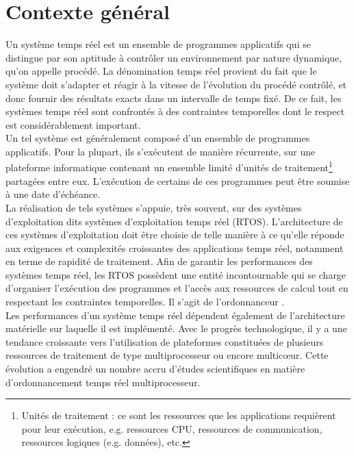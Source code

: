 \section{{Contexte général}}


Un  système  temps  réel  est  un  ensemble  de  programmes  applicatifs  qui  se  distingue  par  son aptitude à contrôler un environnement par nature dynamique, qu’on appelle procédé. La dénomination temps réel provient du fait que le système doit s’adapter et réagir à la vitesse de l’évolution du procédé contrôlé, et donc fournir des résultats exacts dans un intervalle de temps fixé. De ce fait, les systèmes temps  réel  sont  confrontés  à  des  contraintes temporelles  dont  le  respect  est  considérablement important.\\


Un tel système est généralement composé d'un ensemble de programmes applicatifs. Pour la plupart, ils s'exécutent de manière récurrente,
sur une plateforme informatique contenant un ensemble limité d’unités de traitement\footnote{Unités  de  traitement :  ce sont  les 
	ressources  que  les  applications  requièrent  pour  leur  exécution,  e.g.  ressources CPU, ressources de 
	communication, ressources logiques (e.g. données), etc.} partagées entre eux. L'exécution de certains de ces programmes peut être soumise à une date d'échéance. \\


La réalisation de tels systèmes s'appuie, très souvent, sur des systèmes d’exploitation dits systèmes d’exploitation temps réel (RTOS). L’architecture de ces systèmes d’exploitation doit être choisie de telle manière à ce qu’elle réponde aux exigences et complexités croissantes des applications temps  réel,  notamment en  terme de rapidité  de 
traitement.  Afin  de  garantir  les  performances  des  systèmes temps réel, les RTOS possèdent une entité incontournable qui se 
charge d’organiser l’exécution des programmes et l’accès aux ressources de calcul tout en respectant les contraintes temporelles. Il s’agit de l’ordonnanceur \cite{FLOMAN}.\\

Les performances d’un  système  temps  réel  dépendent également de
l’architecture matérielle sur laquelle il est implémenté. Avec  le  progrès  technologique, il y a une 
tendance croissante vers l’utilisation de plateformes constituées de plusieurs ressources de traitement de type multiprocesseur ou encore multicœur. Cette  évolution  a  engendré  un  nombre  accru d’études scientifiques  en  matière  d’ordonnancement temps réel multiprocesseur.\\

